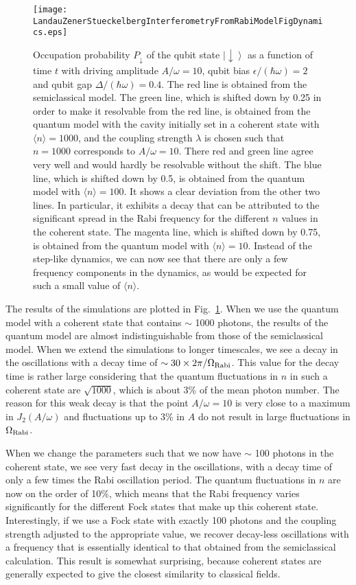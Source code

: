 \documentclass[aps,twocolumn,superscriptaddress]{revtex4}
\newcommand{\ket}[1] {\left| #1 \right\rangle}
\begin{document}
\begin{figure}[h]
\texttt{[image: LandauZenerStueckelbergInterferometryFromRabiModelFigDynamics.eps]}
\caption{Occupation probability $P_{\downarrow}$ of the qubit state $\ket{\downarrow}$ as a function of time $t$ with driving amplitude $A/\omega=10$, qubit bias $\epsilon/(\hbar\omega)=2$ and qubit gap $\Delta/(\hbar\omega)=0.4$. The red line is obtained from the semiclassical model. The green line, which is shifted down by 0.25 in order to make it resolvable from the red line, is obtained from the quantum model with the cavity initially set in a coherent state with $\langle n \rangle=1000$, and the coupling strength $\lambda$ is chosen such that $n=1000$ corresponds to $A/\omega=10$. There red and green line agree very well and would hardly be resolvable without the shift. The blue line, which is shifted down by 0.5, is obtained from the quantum model with $\langle n \rangle=100$. It shows a clear deviation from the other two lines. In particular, it exhibits a decay that can be attributed to the significant spread in the Rabi frequency for the different $n$ values in the coherent state. The magenta line, which is shifted down by 0.75, is obtained from the quantum model with $\langle n \rangle=10$. Instead of the step-like dynamics, we can now see that there are only a few frequency components in the dynamics, as would be expected for such a small value of $\langle n \rangle$.}
%
\label{Fig:TimeDomainDynamics}
\end{figure}

The results of the simulations are plotted in Fig.~\ref{Fig:TimeDomainDynamics}. When we use the quantum model with a coherent state that contains $\sim$ 1000 photons, the results of the quantum model are almost indistinguishable from those of the semiclassical model. When we extend the simulations to longer timescales, we see a decay in the oscillations with a decay time of $\sim 30\times 2\pi/\Omega_{\rm Rabi}$. This value for the decay time is rather large considering that the quantum fluctuations in $n$ in such a coherent state are $\sqrt{1000}$, which is about 3\% of the mean photon number. The reason for this weak decay is that the point $A/\omega=10$ is very close to a maximum in $J_2(A/\omega)$ and fluctuations up to 3\% in $A$ do not result in large fluctuations in $\Omega_{\rm Rabi}$.

When we change the parameters such that we now have $\sim$ 100 photons in the coherent state, we see very fast decay in the oscillations, with a decay time of only a few times the Rabi oscillation period. The quantum fluctuations in $n$ are now on the order of 10\%, which means that the Rabi frequency varies significantly for the different Fock states that make up this coherent state. Interestingly, if we use a Fock state with exactly 100 photons and the coupling strength adjusted to the appropriate value, we recover decay-less oscillations with a frequency that is essentially identical to that obtained from the semiclassical calculation. This result is somewhat surprising, because coherent states are generally expected to give the closest similarity to classical fields.
\end{document}
